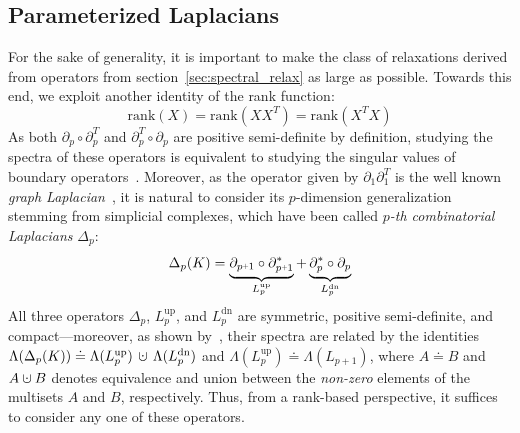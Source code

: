 \documentclass[10pt]{article}
\numberwithin{equation}{section}
\newcommand{\+}{%
	\raisebox{0.18ex}{\scaleobj{0.55}{+}}
}
\theoremstyle{definition}
\theoremstyle{definition}
\newcommand{\cupdot}{\mathbin{\mathaccent\cdot\cup}}
\begin{document}
\subsection{Parameterized Laplacians}\label{sec:laplacian_theory2}
 For the sake of generality, it is important to make the class of relaxations derived from operators from section~\ref{sec:spectral_relax} as large as possible.
Towards this end, we exploit another identity of the rank function:
$$\mathrm{rank}(X) = \mathrm{rank}(X X^T) = \mathrm{rank}(X^T X)$$ 
As both $\partial_p \circ \partial_p^T$ and $\partial_p^T \circ \partial_p$ are positive semi-definite by definition, studying the spectra of these operators is equivalent to studying the singular values of boundary operators~\cite{horak2013spectra}.  
Moreover, as the operator given by $\partial_1 \partial_1^T$ is the well known \emph{graph Laplacian}~\cite{chung1997spectral}, it is natural to consider its $p$-dimension generalization stemming from simplicial complexes, which have been called \emph{$p$-th combinatorial Laplacians} $\Delta_p$: 
\begin{equation}\label{eq:comb_lap}
	\Delta_p(K) = 
	\underbrace{\partial_{p\+1} \circ \partial_{p\+1}^\ast}_{L_p^{\text{up}}} + \underbrace{\partial_{p}^\ast  \circ  \partial_{p}}_{L_p^{\text{dn}}} 
\end{equation}
\noindent 
All three operators $\Delta_p$, $L_p^{\text{up}}$, and $L_p^{\text{dn}}$ are symmetric, positive semi-definite, and compact---moreover, as shown by~\cite{horak2013spectra}, their spectra are related by the identities $\Lambda(\Delta_p(K)) \doteq \Lambda(L_p^{\text{up}}) \, \cupdot \, \Lambda(L_p^{\text{dn}})$ and $\Lambda(L_p^{\text{up}}) \doteq \Lambda(L_{p+1})$,
where $A \doteq B$ and $A \cupdot B$ denotes equivalence and union between the \emph{non-zero} elements of the multisets $A$ and $B$, respectively.
Thus, from a rank-based perspective, it suffices to consider any one of these operators.
\end{document}
